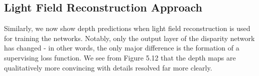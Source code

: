 \subsection{Light Field Reconstruction Approach}

Similarly, we now show depth predictions when light field reconstruction is used for training the networks. Notably, only the output layer of the disparity network has changed - in other words, the only major difference is the formation of a supervising loss function. We see from Figure 5.12 that the depth maps are qualitatively more convincing with details resolved far more clearly.

\begin{figure}[H]
    \centering
    \\ 
\end{figure}

